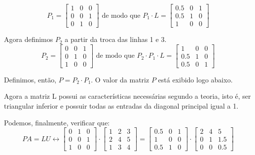 \documentclass[12pt]{article}
\begin{document}
\begin{equation*}
	P_1=
	\begin{bmatrix}
		1 & 0 & 0\\
		0 & 0 & 1\\
		0 & 1 & 0
	\end{bmatrix} \mbox{ de modo que }
	P_1\cdot L=
	\begin{bmatrix}
		0.5 & 0 & 1\\
		0.5 & 1 & 0\\
		1 & 0 & 0
	\end{bmatrix}
\end{equation*}

Agora definimos $P_2$ a partir da troca das linhas 1 e 3.
\begin{equation*}
	P_2=
	\begin{bmatrix}
		0 & 0 & 1\\
		0 & 1 & 0\\
		1 & 0 & 0
	\end{bmatrix} \mbox{ de modo que }
	P_2\cdot P_1\cdot L=
	\begin{bmatrix}
		1 & 0 & 0\\
		0.5 & 1 & 0\\
		0.5 & 0 & 1
	\end{bmatrix}
\end{equation*}

Definimos, então, $P=P_2\cdot P_1$. O valor da matriz $P$ está exibido logo abaixo.

Agora a matriz L possui as características necessárias segundo a teoria, isto é, ser triangular inferior e possuir todas as entradas da diagonal principal igual a 1.

Podemos, finalmente, verificar que:
\begin{equation*}
	PA=LU \leftrightarrow 
	\begin{bmatrix}
		0 & 1 & 0\\
		0 & 0 & 1\\
		1 & 0 & 0
	\end{bmatrix}
	\cdot  
	\begin{bmatrix}
		1 & 2 & 3\\
		2 & 4 & 5\\
		1 & 3 & 4
	\end{bmatrix}=
	\begin{bmatrix}
		0.5 & 0 & 1\\
		1 & 0 & 0\\
		0.5 & 1 & 0
	\end{bmatrix} \cdot
	\begin{bmatrix}
		2 & 4 & 5\\
		0 & 1 & 1.5\\
		0 & 0 & 0.5
	\end{bmatrix}
\end{equation*}
\end{document}
